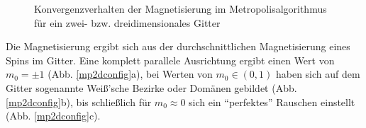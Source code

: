 \begin{figure}[H]
	\centering
	\caption{Konvergenzverhalten der Magnetisierung im Metropolisalgorithmus für ein zwei- bzw. dreidimensionales Gitter}
	\label{mpkonv}
\end{figure}
Die Magnetisierung ergibt sich aus der durchschnittlichen Magnetisierung eines Spins im Gitter. Eine komplett parallele Ausrichtung ergibt einen Wert von $m_{0}=\pm1$ (Abb. \ref{mp2dconfig}a), bei Werten von $m_{0} \in(0,1)$ haben sich auf dem Gitter sogenannte Weiß’sche Bezirke oder Domänen gebildet (Abb. \ref{mp2dconfig}b), bis schließlich für $m_{0}\approx0$ sich ein “perfektes” Rauschen einstellt (Abb. \ref{mp2dconfig}c).
